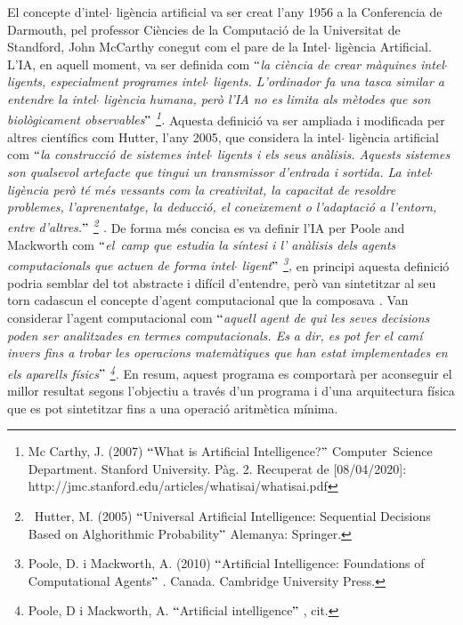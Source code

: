 \documentclass[12pt]{article}
\begin{document}
\vspace{\baselineskip}
\begin{justify}
El concepte d’intel$ \cdot $ ligència artificial va ser creat l’any 1956 a la Conferencia de Darmouth, pel professor Ciències de la Computació de la Universitat de Standford, John McCarthy conegut com el pare de la Intel$ \cdot $ ligència Artificial. L’IA, en aquell moment, va ser definida com $``$\textit{la ciència de crear màquines intel$ \cdot $ ligents, especialment programes intel$ \cdot $ ligents. L’ordinador fa una tasca similar a entendre la intel$ \cdot $ ligència humana, però l’IA no es limita als mètodes que son biològicament observables$"$ \footnote{ Mc Carthy, J. (2007) $``$What is Artificial Intelligence?$"$  Computer\ Science Department. Stanford University.  Pàg. 2. Recuperat de [08/04/2020]: http://jmc.stanford.edu/articles/whatisai/whatisai.pdf }. }Aquesta definició va ser ampliada i modificada per altres científics com Hutter, l’any 2005, que considera la intel$ \cdot $ ligència artificial com $``$\textit{la construcció de sistemes intel$ \cdot $ ligents i els seus anàlisis. Aquests sistemes son qualsevol artefacte que tingui un transmissor d’entrada i sortida. La intel$ \cdot $ ligència però té més vessants com la creativitat, la capacitat de resoldre problemes, l’aprenentatge, la deducció, el coneixement o l’adaptació a l’entorn, entre d’altres.$"$ \footnote{\  Hutter, M. (2005) $``$Universal Artificial Intelligence: Sequential Decisions Based on Alghorithmic Probability$"$  Alemanya: Springer. } .  }De forma més concisa es va definir l’IA per Poole and Mackworth com $``$\textit{el\ camp  que estudia la síntesi i l’ anàlisis dels agents computacionals que actuen de forma intel$ \cdot $ ligent$"$ \footnote{ Poole, D. i Mackworth, A. (2010) $``$Artificial Intelligence: Foundations of Computational Agents$"$ . Canada. Cambridge University Press.  }, }en principi aquesta definició podria semblar del tot abstracte i difícil d’entendre, però van sintetitzar al seu torn cadascun el concepte d’agent computacional que la composava \textit{. }Van considerar l’agent computacional com \textit{$``$aquell agent de qui les seves decisions poden ser analitzades en termes computacionals. Es a dir, es pot fer el camí invers fins a trobar les operacions matemàtiques que han estat implementades en els aparells físics$"$ \footnote{ Poole, D i Mackworth, A. $``$Artificial intelligence$"$ , cit. }. } En resum, aquest programa es comportarà per aconseguir el millor resultat segons l’objectiu a través d’un programa i d’una arquitectura física que es pot sintetitzar fins a una operació aritmètica mínima.
\end{justify}\par
\end{document}

